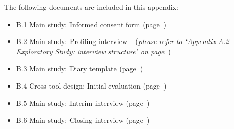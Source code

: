 
The following documents are included in this appendix:

\begin{itemize}
\item B.1 Main study: Informed consent form (page~\pageref{chap:appendices-main-study-material:consent})
\item B.2 Main study: Profiling interview --  (\textit{please refer to `Appendix A.2 Exploratory Study: interview structure' on page~\pageref{chap:appendices-exploratory-study-material:template}})
\item B.3 Main study: Diary template (page~\pageref{chap:appendices-main-study-material:diary})
\item B.4 Cross-tool design: Initial evaluation (page~\pageref{chap:appendices-main-study-material:initial})
\item B.5 Main study: Interim interview (page~\pageref{chap:appendices-main-study-material:interim})
\item B.6 Main study: Closing interview (page~\pageref{chap:appendices-main-study-material:closing})
\end{itemize}


